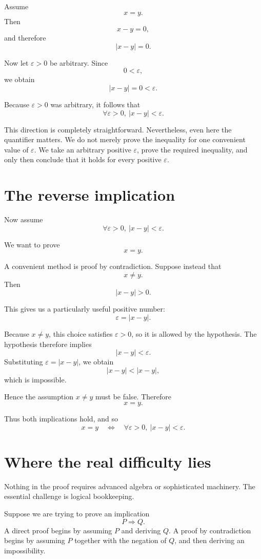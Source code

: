 \documentclass{essay}
\begin{document}
Assume
\[ x=y. \]
Then
\[ x-y=0, \]
and therefore
\[ |x-y|=0. \]

Now let \(\varepsilon>0\) be arbitrary. Since
\[ 0<\varepsilon, \]
we obtain
\[ |x-y|=0<\varepsilon. \]

Because \(\varepsilon>0\) was arbitrary, it follows that
\[ \forall \varepsilon>0,\ |x-y|<\varepsilon. \]

This direction is completely straightforward. Nevertheless, even here the quantifier matters. We do not merely prove the inequality for one convenient value of \(\varepsilon\). We take an arbitrary positive \(\varepsilon\), prove the required inequality, and only then conclude that it holds for every positive \(\varepsilon\).

\section{The reverse implication}

Now assume
\[ \forall \varepsilon>0,\ |x-y|<\varepsilon. \]

We want to prove
\[ x=y. \]

A convenient method is proof by contradiction. Suppose instead that
\[ x\ne y. \]
Then
\[ |x-y|>0. \]

This gives us a particularly useful positive number:
\[ \varepsilon=|x-y|. \]

Because \(x\ne y\), this choice satisfies \(\varepsilon>0\), so it is allowed by the hypothesis. The hypothesis therefore implies
\[ |x-y|<\varepsilon. \]
Substituting \(\varepsilon=|x-y|\), we obtain
\[ |x-y|<|x-y|, \]
which is impossible.

Hence the assumption \(x\ne y\) must be false. Therefore
\[ x=y. \]

Thus both implications hold, and so
\[ x=y \quad\Longleftrightarrow\quad \forall \varepsilon>0,\ |x-y|<\varepsilon. \]

\section{Where the real difficulty lies}

Nothing in the proof requires advanced algebra or sophisticated machinery. The essential challenge is logical bookkeeping.

Suppose we are trying to prove an implication
\[ P\Longrightarrow Q. \]
A direct proof begins by assuming \(P\) and deriving \(Q\). A proof by contradiction begins by assuming \(P\) together with the negation of \(Q\), and then deriving an impossibility.
\end{document}
